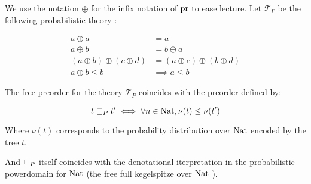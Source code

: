 \begin{alemma}
    \label{lem:probpreo}
    We use the notation $\oplus$ for the infix notation 
    of $\operatorname{pr}$ to ease lecture.
    Let $\mathcal{T}_P$ be the following probabilistic theory 
    \cite{heckmann1994probabilistic}:

    \begin{equation*}
        \begin{array}{rl}
            a \oplus a &= a \\
            a \oplus b &= b \oplus a \\
            (a \oplus b) \oplus (c \oplus d) &= (a \oplus c) \oplus (b \oplus d) \\
            a \oplus b \leq b &\implies a \leq b
        \end{array}
    \end{equation*}

    The free preorder for the theory $\mathcal{T}_P$
    coincides with the preorder defined by:
    
    \begin{equation*}
        t \sqsubseteq_P t' \iff 
        \forall n \in \textnormal{Nat}, \nu (t) \leq \nu (t')
    \end{equation*}

    Where $\nu(t)$ corresponds to the probability distribution 
    over $\textnormal{Nat}$ encoded by the tree $t$.

    And $\sqsubseteq_P$ itself coincides with the denotational
    iterpretation in the probabilistic powerdomain for $\textnormal{Nat}$
    (the free full kegelspitze over $\textnormal{Nat}$ \cite{KeimelP2016}).

\end{alemma}

